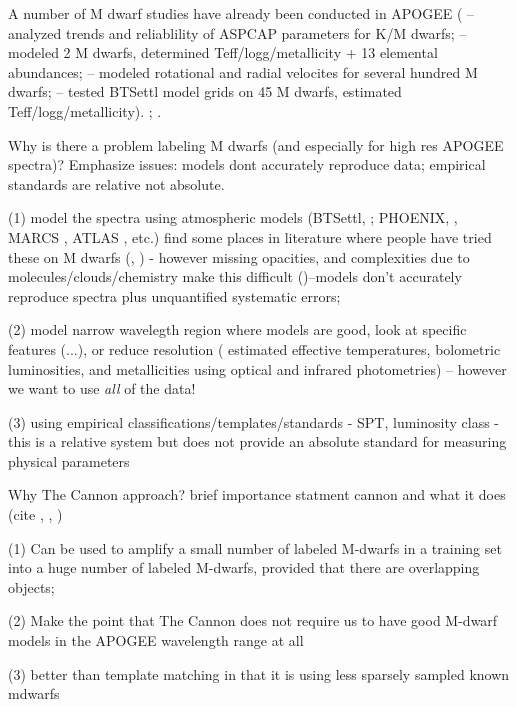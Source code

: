 \documentclass[modern]{aastex62}
\begin{document}
A number of M dwarf studies have already been conducted in APOGEE (\citealt{Schmidt:2016} -- analyzed trends and reliablility of ASPCAP parameters for K/M dwarfs; \citealt{Souto:2017} -- modeled 2 M dwarfs, determined Teff/logg/metallicity + 13 elemental abundances; \citealt{Desphande:2013} -- modeled rotational and radial velocites for several hundred M dwarfs; \citealt{Rajpurohit:2018} -- tested BTSettl model grids on 45 M dwarfs, estimated Teff/logg/metallicity). \citealt{Gilhool:2018}; \citealt{Skinner:2018}.

Why is there a problem labeling M dwarfs (and especially for high res APOGEE spectra)? Emphasize issues: models dont accurately reproduce data; empirical standards are relative not absolute. 

 (1) model the spectra using atmospheric models (BTSettl, \citealt{Allard:2011}; PHOENIX, \citealt{Husser:2013}, MARCS \citealt{Gustafsson:2008}, ATLAS \citealt{Castelli:2004}, etc.) find some places in literature where people have tried these on M dwarfs (\citealt{Rajpurohit:2014}, \citealt{Rajpurohit:2018}) - however missing opacities, and complexities due to molecules/clouds/chemistry make this difficult (\citealt{Allard:2013})--models don't accurately reproduce spectra plus unquantified systematic errors; 

 (2) model narrow wavelegth region where models are good, look at specific features (\citealt{Rojas-Ayala:2012}...), or reduce resolution (\citealt{Casagrande:2008} estimated effective temperatures, bolometric luminosities, and metallicities using optical and infrared photometries) -- however we want to use \emph{all} of the data!

 (3) using empirical classifications/templates/standards - SPT, luminosity class - this is a relative system but does not provide an absolute standard for measuring physical parameters

Why The Cannon approach? brief importance statment cannon and what it does (cite \citealt{Ness:2015}, \citealt{Ho:2017a}, \citealt{Casey:2016})

 (1) Can be used to amplify a small number of labeled M-dwarfs in a training set into a huge number of labeled M-dwarfs, provided that there are overlapping objects; 

 (2) Make the point that The Cannon does not require us to have good M-dwarf models in the APOGEE wavelength range at all 

 (3) better than template matching in that it is using less sparsely sampled known mdwarfs
\end{document}
